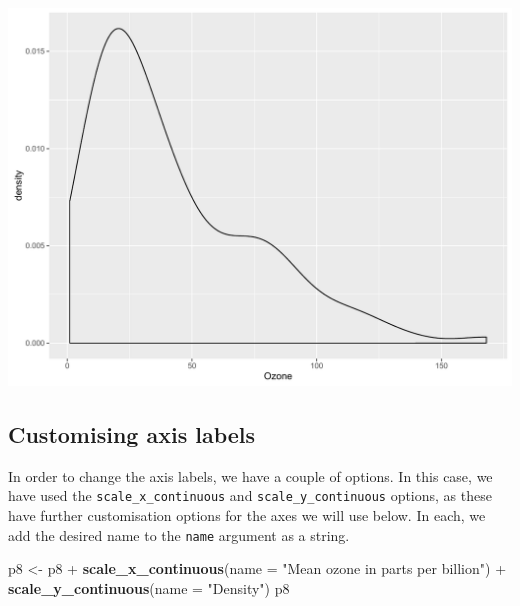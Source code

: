\documentclass[]{article}
\newenvironment{Shaded}{\begin{snugshade}}{\end{snugshade}}
\newcommand{\KeywordTok}[1]{\textcolor[rgb]{0.13,0.29,0.53}{\textbf{{#1}}}}
\newcommand{\DataTypeTok}[1]{\textcolor[rgb]{0.13,0.29,0.53}{{#1}}}
\newcommand{\StringTok}[1]{\textcolor[rgb]{0.31,0.60,0.02}{{#1}}}
\newcommand{\NormalTok}[1]{{#1}}
\begin{document}
\begin{center}\includegraphics{0_all_posts_pdf/density_1-1} \end{center}

\subsection{Customising axis labels}\label{customising-axis-labels-1}

In order to change the axis labels, we have a couple of options. In this
case, we have used the \texttt{scale\_x\_continuous} and
\texttt{scale\_y\_continuous} options, as these have further
customisation options for the axes we will use below. In each, we add
the desired name to the \texttt{name} argument as a string.

\begin{Shaded}
\begin{Highlighting}[]
\NormalTok{p8 <-}\StringTok{ }\NormalTok{p8 +}\StringTok{ }\KeywordTok{scale_x_continuous}\NormalTok{(}\DataTypeTok{name =} \StringTok{"Mean ozone in parts per billion"}\NormalTok{) +}
\StringTok{      }\KeywordTok{scale_y_continuous}\NormalTok{(}\DataTypeTok{name =} \StringTok{"Density"}\NormalTok{)}
\NormalTok{p8}
\end{Highlighting}
\end{Shaded}
\end{document}

